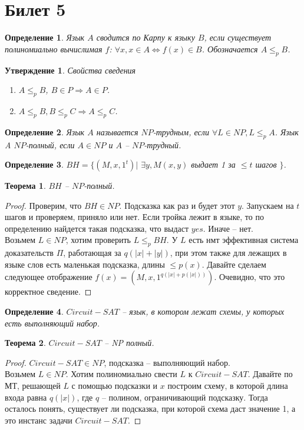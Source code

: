 \documentclass[12pt, letterpaper]{article}
\newtheorem{theorem}{Теорема}[section]
\newtheorem{prop}{Утверждение}[section]
\newtheorem{defi}{Определение}[section]
\newcommand{\leqp}{\leq_{p}}
\begin{document}
\section{Билет 5}
\begin{defi}
Язык $A$ сводится по Карпу к языку $B$, если существует полиномиально вычислимая $f$: $\forall x, x \in A \Longleftrightarrow f(x) \in B$. Обозначается $A \leq_{p} B$.
\end{defi}
\begin{prop} Свойства сведения
\begin{enumerate}
\item $A \leqp B$, $B \in P \Rightarrow A \in P$.
\item $A \leqp B, B \leqp C \Rightarrow A \leqp C$. 
\end{enumerate}
\end{prop}

\begin{defi}
Язык $A$ называется $NP$-трудным, если $\forall L \in NP, L \leqp A$. Язык A $NP$-полный, если $A\in NP$ и $A$ -- $NP$-трудный. 
\end{defi}

\begin{defi}
$BH = \{ (M, x, 1^t) | $ $\exists y, M(x,y)$ выдает 1 за $\leq t$ шагов  $\}$. 
\end{defi}

\begin{theorem}
$BH$ -- $NP$-полный.
\end{theorem}
\begin{proof}
Проверим, что $BH \in NP$. Подсказка как раз и будет этот $y$. Запускаем на $t$ шагов и проверяем, приняло или нет. Если тройка лежит в языке, то по определению найдется такая подсказка, что выдаст $yes$. Иначе -- нет.\\
Возьмем $L \in NP$, хотим проверить $L \leqp BH$. У $L$ есть нмт эффективная система доказательств $\Pi$, работающая за $q(|x|+|y|)$, при этом также для лежащих в языке слов есть маленькая подсказка, длины $\leq p(x)$. Давайте сделаем следующее отображение $f(x) = (M, x, 1^{q(|x|+p(|x|))})$. Очевидно, что это корректное сведение.
\end{proof}

\begin{defi}
$Circuit - SAT$ -- язык, в котором лежат схемы, у которых есть выполняющий набор.
\end{defi}

\begin{theorem}
$Circuit - SAT$ -- NP полный.
\end{theorem}
\begin{proof}
$Circuit-SAT \in NP$, подсказка -- выполняющий набор. \\
Возьмем $L \in NP$. Хотим полиномиально свести $L$ к $Circuit-SAT$. Давайте по МТ, решающей $L$ с помощью подсказки и $x$ построим схему, в которой длина входа равна $q(|x|)$, где $q$ -- полином, ограничивающий подсказку. Тогда осталось понять, существует ли подсказка, при которой схема даст значение 1, а это инстанс задачи $Circuit-SAT$.
\end{proof}
\end{document}
